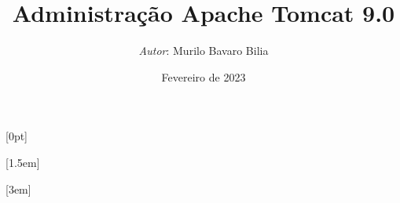 \cftsetpnumwidth{1cm} %
\usepackage{tabularx} %


\title{\ubuntu Administração Apache Tomcat 9.0} %
\author{\emph{Autor}: Murilo Bavaro Bilia} %
\date{Fevereiro de 2023} %

\usepackage{titletoc}

[0pt]
{\addvspace{1em}}
{\bfseries\chaptername\ \thecontentslabel\quad}
{}
{\hfill\contentspage}

[1.5em]
{\addvspace{0.5em}}
{\contentslabel{1.5em}\hspace{0.5em}}
{\hspace{0.5em}}
{\contentspage}

[3em]
{\addvspace{0.25em}}
{\contentslabel{2.25em}\hspace{0.75em}}
{\hspace{0.75em}}
{\contentspage}
